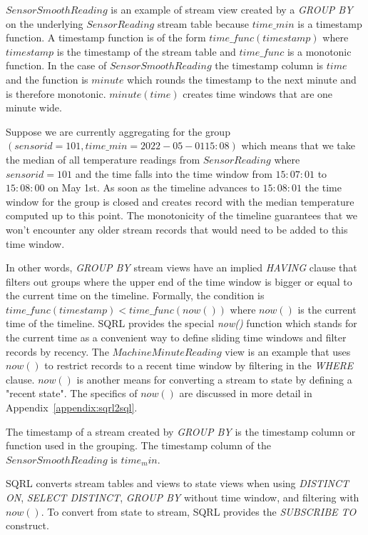 \documentclass[	DIV=calc,%
							paper=letter,%
							fontsize=11pt,%
							twocolumn]{scrartcl}	 					%
\begin{document}
$SensorSmoothReading$ is an example of stream view created by a \emph{GROUP BY} on the underlying $SensorReading$ stream table because $time\_min$ is a timestamp function. A timestamp function is of the form $time\_func(timestamp)$ where $timestamp$ is the timestamp of the stream table and $time\_func$ is a monotonic function. In the case of $SensorSmoothReading$ the timestamp column is $time$ and the function is $minute$ which rounds the timestamp to the next minute and is therefore monotonic. $minute(time)$ creates time windows that are one minute wide.

Suppose we are currently aggregating for the group $(sensorid = 101, time\_min = 2022-05-01 15:08)$ which means that we take the median of all temperature readings from $SensorReading$ where $sensorid = 101$ and the time falls into the time window from $15:07:01$ to $15:08:00$ on May 1st. As soon as the timeline advances to $15:08:01$ the time window for the group is closed and creates record with the median temperature computed up to this point. The monotonicity of the timeline guarantees that we won't encounter any older stream records that would need to be added to this time window.

In other words, \emph{GROUP BY} stream views have an implied \emph{HAVING} clause that filters out groups where the upper end of the time window is bigger or equal to the current time on the timeline. Formally, the condition is $time\_func(timestamp) < time\_func(now())$ where $now()$ is the current time of the timeline.
SQRL provides the special \emph{now()} function which stands for the current time as a convenient way to define sliding time windows and filter records by recency. The $MachineMinuteReading$ view is an example that uses $now()$ to restrict records to a recent time window by filtering in the \emph{WHERE} clause. $now()$ is another means for converting a stream to state by defining a "recent state". The specifics of $now()$ are discussed in more detail in Appendix~\ref{appendix:sqrl2sql}.

The timestamp of a stream created by \emph{GROUP BY} is the timestamp column or function used in the grouping. The timestamp column of the $SensorSmoothReading$ is $time_min$.

SQRL converts stream tables and views to state views when using \emph{DISTINCT ON}, \emph{SELECT DISTINCT}, \emph{GROUP BY} without time window, and filtering with $now()$. To convert from state to stream, SQRL provides the \emph{SUBSCRIBE TO} construct.
\end{document}
